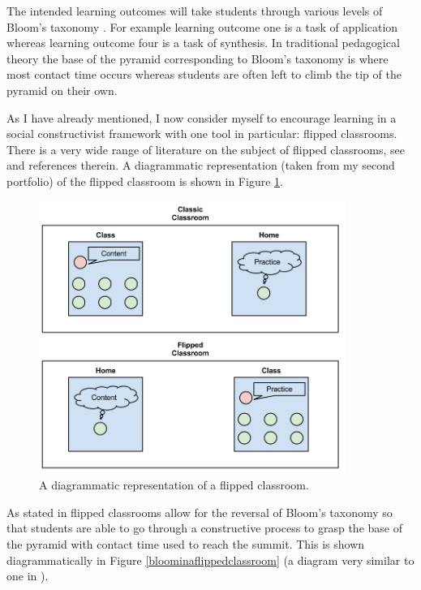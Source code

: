 \documentclass{article}
\begin{document}
The intended learning outcomes will take students through various levels of Bloom's taxonomy \cite{bloom_taxonomy_1969, shorser_blooms_1999}. For example learning outcome one is a task of application whereas learning outcome four is a task of synthesis. In traditional pedagogical theory the base of the pyramid corresponding to Bloom's taxonomy is where most contact time occurs whereas students are often left to climb the tip of the pyramid on their own.

As I have already mentioned, I now consider myself to encourage learning in a social constructivist framework \cite{jordan_approaches_2008} with one tool in particular: flipped classrooms. There is a very wide range of literature on the subject of flipped classrooms, see \cite{noora_review_2013, weinberg_what_2013} and references therein. A diagrammatic representation (taken from my second portfolio) of the flipped classroom is shown in Figure \ref{flipped_classroom_diagram}.

\begin{figure}[htdp]
\begin{center}
\includegraphics[width=10cm]{./Images/flipped_classroom_diagram.png}
\caption{A diagrammatic representation of a flipped classroom.}\label{flipped_classroom_diagram}
\end{center}
\end{figure}

As stated in \cite{robert_talbert_inverted_2013} flipped classrooms allow for the reversal of Bloom's taxonomy so that students are able to go through a constructive process to grasp the base of the pyramid with contact time used to reach the summit. This is shown diagrammatically in Figure
\ref{bloominaflippedclassroom} (a diagram very similar to one in \cite{robert_talbert_inverted_2013}).
\end{document}
